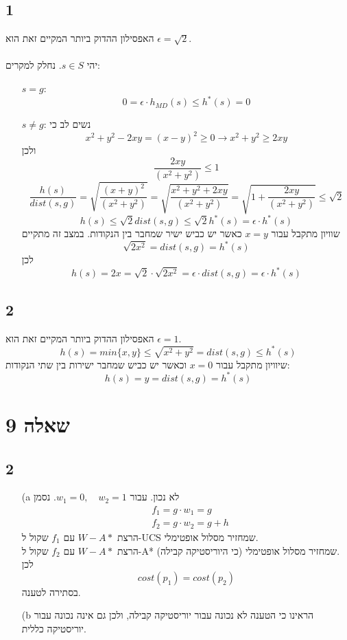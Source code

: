 \documentclass{article}
\begin{document}
\subsection*{1}
האפסילון ההדוק ביותר המקיים זאת הוא
$\epsilon = \sqrt{2}$.\\\\
יהי
$s \in S$.
נחלק למקרים:
\begin{itemize}
\item[$s=g$:]
$$0 = \epsilon \cdot h_{MD}(s) \leq h^*(s) = 0$$
\item[$s\neq g$:]
נשים לב כי
$$x^2 + y^2 - 2xy = (x-y)^2 \geq 0 \rightarrow x^2 + y^2 \geq 2xy$$
ולכן
$$\frac{2xy}{(x^2+y^2)} \leq 1$$
$$\frac{h(s)}{dist(s,g)} = \sqrt{\frac{(x+y)^2}{(x^2+y^2)}} = \sqrt{\frac{x^2+y^2+2xy}{(x^2+y^2)}}=\sqrt{1+\frac{2xy}{(x^2+y^2)}}\leq \sqrt{2}$$
$$h(s) \leq \sqrt{2}dist(s,g) \leq \sqrt{2}h^*(s) = \epsilon \cdot h^*(s)$$
שוויון מתקבל עבור 
$x=y$
כאשר יש כביש ישיר שמחבר בין הנקודות. במצב זה מתקיים
$$\sqrt{2x^2} = dist(s,g) = h^*(s)$$
לכן
$$h(s) = 2x = \sqrt{2}\cdot \sqrt{2x^2} = \epsilon \cdot dist(s,g) = \epsilon \cdot h^*(s)$$
\end{itemize}
\subsection*{2}
האפסילון ההדוק ביותר המקיים זאת הוא 
$\epsilon = 1$.\\
$$h(s) = min\{x,y\} \leq \sqrt{x^2+y^2} = dist(s,g) \leq  h^*(s)$$
שיוויון מתקבל עבור 
$x = 0$
וכאשר יש כביש שמחבר ישירות בין שתי הנקודות:
$$h(s) = y = dist(s,g) = h^*(s)$$
\section{שאלה 9}
\subsection*{2}
\begin{itemize}
\item[(a]
לא נכון. עבור 
$w_1 = 0, \quad w_2 = 1$.
נסמן
\begin{align*}
&f_1 = g \cdot w_1 = g\\
&f_2 = g \cdot w_2 = g + h
\end{align*}
הרצת 
$W-A*$
עם
$f_1$
שקול ל-UCS שמחזיר מסלול אופטימלי.\\
הרצת 
$W-A*$
עם
$f_2$
שקול ל-A* שמחזיר מסלול אופטימלי (כי היוריסטיקה קבילה).\\
לכן
$$cost(p_1) = cost(p_2)$$
בסתירה לטענה.
\item[(b]
הראינו כי הטענה לא נכונה עבור יוריסטיקה קבילה, ולכן גם אינה נכונה עבור יוריסטיקה כללית.
\end{itemize}
\end{document}
